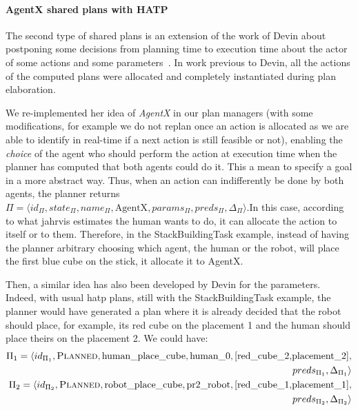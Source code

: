 \documentclass[a4paper,11pt,twoside]{StyleThese}
\begin{document}
\paragraph{AgentX shared plans with HATP}
The second type of shared plans is an extension of the work of Devin about postponing some decisions from planning time to execution time about the actor of some actions and some parameters~\cite{devin_2017_decisions}. In work previous to Devin, all the actions of the computed plans were allocated and completely instantiated during plan elaboration. 

We re-implemented her idea of \emph{AgentX} in our plan managers (with some modifications, for example we do not replan once an action is allocated as we are able to identify in real-time if a next action is still feasible or not), enabling the \emph{choice} of the agent who should perform the action at execution time when the planner has computed that both agents could do it. This a mean to specify a goal in a more abstract way. Thus, when an action can indifferently be done by both agents, the planner returns  $\Pi=\langle id_\Pi,state_\Pi,name_\Pi,\text{AgentX},params_\Pi,preds_\Pi,\Delta_\Pi\rangle$.In this case, according to what \acrshort{jahrvis} estimates the human wants to do, it can allocate the action to itself or to them. Therefore, in the StackBuildingTask example, instead of having the planner arbitrary choosing which agent, the human or the robot, will place the first blue cube on the stick, it allocate it to AgentX.
\thispagestyle{example}

Then, a similar idea has also been developed by Devin for the parameters. Indeed, with usual \acrshort{hatp} plans, still with the StackBuildingTask example, the planner would have generated a plan where it is already decided that the robot should place, for example, its red cube on the placement 1 and the human should place theirs on the placement 2. We could have:
\begin{align*}
	\Pi_1=\langle id_{\Pi_1},\textsc{Planned},\text{human\_place\_cube},\text{human\_0}, [\text{red\_cube\_2,placement\_2}],&\\ preds_{\Pi_1},\Delta_{\Pi_1}\rangle&\\
	\Pi_2=\langle id_{\Pi_2},\textsc{Planned},\text{robot\_place\_cube},\text{pr2\_robot}, [\text{red\_cube\_1,placement\_1}],&\\ preds_{\Pi_2},\Delta_{\Pi_2}\rangle&
\end{align*}
  
\end{document}
